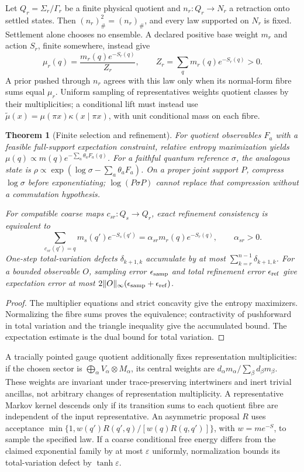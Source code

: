 \documentclass[11pt]{article}
\newtheorem{theorem}{Theorem}[section]
\theoremstyle{remark}
\theoremstyle{plain}
\begin{document}
Let \(Q_r=\Sigma_r/\Gamma_r\) be a finite physical quotient and
\(n_r:Q_r\to N_r\) a retraction onto settled states. Then
\((n_r)_\#^2=(n_r)_\#\), and every law supported on \(N_r\) is fixed.
Settlement alone chooses no ensemble. A declared positive base weight
\(m_r\) and action \(S_r\), finite somewhere, instead give
\[
 \mu_r(q)=\frac{m_r(q)e^{-S_r(q)}}{Z_r},\qquad
 Z_r=\sum_qm_r(q)e^{-S_r(q)}>0.
\]
A prior pushed through \(n_r\) agrees with this law only when its
normal-form fibre sums equal \(\mu_r\). Uniform sampling of representatives
weights quotient classes by their multiplicities; a conditional lift must
instead use \(\widetilde\mu(x)=\mu(\pi x)\kappa(x\mid\pi x)\), with
unit conditional mass on each fibre.

\begin{theorem}[Finite selection and refinement]
For quotient observables \(F_a\) with a feasible full-support expectation
constraint, relative entropy maximization yields
\(\mu(q)\propto m(q)e^{-\sum_a\theta_aF_a(q)}\).
For a faithful quantum reference \(\sigma\), the analogous state is
\(\rho\propto\exp(\log\sigma-\sum_a\theta_aF_a)\).
On a proper joint support \(P\), compress \(\log\sigma\) before
exponentiating; \(\log(P\sigma P)\) cannot replace that compression
without a commutation hypothesis.

For compatible coarse maps \(c_{sr}:Q_s\to Q_r\), exact refinement
consistency is equivalent to
\[
 \sum_{c_{sr}(q')=q}m_s(q')e^{-S_s(q')}
 =\alpha_{sr}m_r(q)e^{-S_r(q)},\qquad \alpha_{sr}>0.
\]
One-step total-variation defects \(\delta_{k+1,k}\) accumulate by at most
\(\sum_{k=r}^{n-1}\delta_{k+1,k}\). For a bounded observable \(O\),
sampling error \(\epsilon_{\rm samp}\) and total refinement error
\(\epsilon_{\rm ref}\) give expectation error at most
\(2\|O\|_\infty(\epsilon_{\rm samp}+\epsilon_{\rm ref})\).
\end{theorem}
\begin{proof}
The multiplier equations and strict concavity give the entropy maximizers.
Normalizing the fibre sums proves the equivalence; contractivity of pushforward
in total variation and the triangle inequality give the accumulated bound.
The expectation estimate is the dual bound for total variation.
\end{proof}

A tracially pointed gauge quotient additionally fixes representation
multiplicities: if the chosen sector is
\(\bigoplus_\alpha V_\alpha\otimes M_\alpha\), its central weights are
\(d_\alpha m_\alpha/\sum_\beta d_\beta m_\beta\). These weights are
invariant under trace-preserving intertwiners and inert trivial ancillas,
not arbitrary changes of representation multiplicity. A representative
Markov kernel descends only if its transition sums to each quotient fibre
are independent of the input representative. An asymmetric proposal \(R\) uses acceptance
\(\min\{1,w(q')R(q',q)/[w(q)R(q,q')]\}\), with
\(w=me^{-S}\), to sample the specified law. If a coarse conditional
free energy differs from the claimed exponential family by at most
\(\varepsilon\) uniformly, normalization bounds its total-variation
defect by \(\tanh\varepsilon\).
\end{document}
